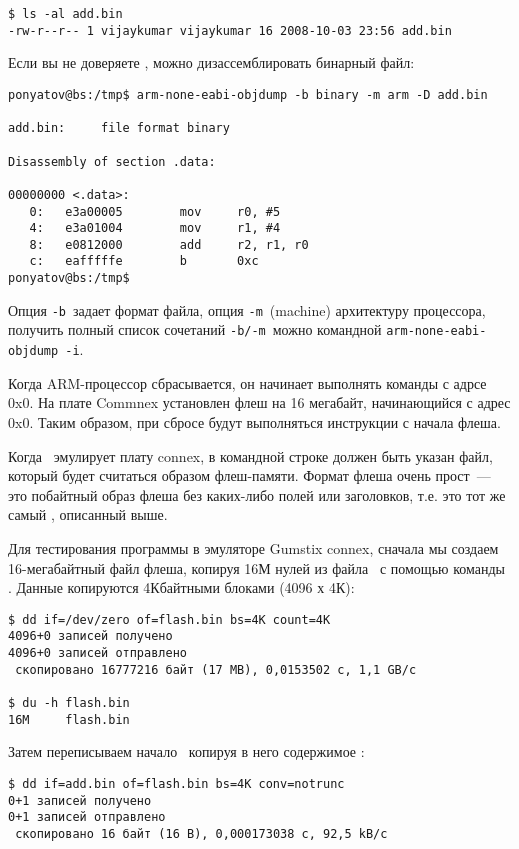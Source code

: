 \begin{verbatim}
$ ls -al add.bin
-rw-r--r-- 1 vijaykumar vijaykumar 16 2008-10-03 23:56 add.bin
\end{verbatim}

Если вы не доверяете , можно дизассемблировать бинарный файл:

\begin{verbatim}
ponyatov@bs:/tmp$ arm-none-eabi-objdump -b binary -m arm -D add.bin

add.bin:     file format binary

Disassembly of section .data:

00000000 <.data>:
   0:   e3a00005        mov     r0, #5
   4:   e3a01004        mov     r1, #4
   8:   e0812000        add     r2, r1, r0
   c:   eafffffe        b       0xc
ponyatov@bs:/tmp$ 
\end{verbatim}
Опция \verb|-b|\ задает формат файла, опция \verb|-m|\ (machine) архитектуру
процессора, получить полный список сочетаний \verb|-b/-m|\ можно командной
\verb|arm-none-eabi-objdump -i|.


Когда ARM-процессор сбрасывается, он начинает выполнять команды с адрсе 0x0.
На плате Commnex установлен флеш на 16 мегабайт, начинающийся с адрес 0x0. Таким
образом, при сбросе будут выполняться инструкции с начала флеша.

Когда \qemu\ эмулирует плату connex, в командной строке должен быть указан файл,
который будет считаться образом флеш-памяти. Формат флеша очень прост\ --- это
побайтный образ флеша без каких-либо полей или заголовков, т.е. это тот же самый
, описанный выше.

Для тестирования программы в эмуляторе Gumstix connex, сначала мы создаем
16-мегабайтный файл флеша, копируя 16М нулей из файла \ с
помощью команды . Данные копируются 4Кбайтными блоками (4096 х 4К):

\begin{verbatim}
$ dd if=/dev/zero of=flash.bin bs=4K count=4K
4096+0 записей получено
4096+0 записей отправлено
 скопировано 16777216 байт (17 MB), 0,0153502 c, 1,1 GB/c

$ du -h flash.bin 
16M     flash.bin
\end{verbatim}

Затем переписываем начало \ копируя в него содержимое
:

\begin{verbatim}
$ dd if=add.bin of=flash.bin bs=4K conv=notrunc
0+1 записей получено
0+1 записей отправлено
 скопировано 16 байт (16 B), 0,000173038 c, 92,5 kB/c
\end{verbatim}

